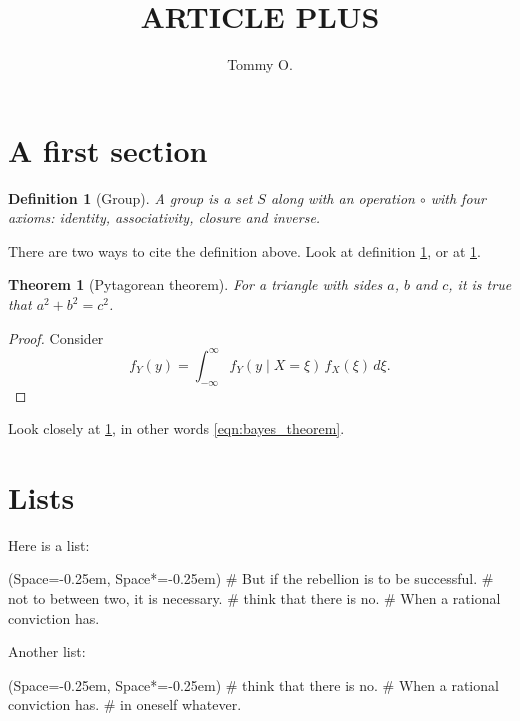 \documentclass[12pt, a4paper]{article} %
\title{ARTICLE PLUS}
\author{Tommy O.}
\theoremstyle{plainspaced}
\newtheorem{theorem}{Theorem}
\newtheorem{definition}{Definition}
\numberwithin{equation}{section}
\newcommand{\listSpace}{-0.25em}
\begin{document}
\maketitle
\pagestyle{fancy}
\begin{abstract}
\blindmathtrue 
\blindtext[1]
\end{abstract}
\tableofcontents


\section{A first section}
\blindmathtrue 
\blindtext[1]
\begin{definition}[Group]
	\label{def:group}
	A group is a set $S$ along with an operation $\circ$
	with four axioms: identity, associativity, closure and inverse.
\end{definition}
There are two ways to cite the definition above.
Look at definition \ref{def:group}, or at \cref{def:group}.

\begin{theorem}[Pytagorean theorem]
	\label{thm:pyta}
	For a triangle with sides $a$, $b$ and $c$,
	it is true that $a^2 + b^2 = c^2$.
\end{theorem}
\begin{proof}
	Consider
	\begin{equation}
	\label{eqn:bayes_theorem}
		f_Y(y) = \int_{-\infty}^\infty f_Y(y\mid X=\xi )\,f_X(\xi)\,d\xi .
	\end{equation}
\end{proof}
Look closely at \cref{thm:pyta}, in other words 
\cref{eqn:bayes_theorem}.

\blindmathtrue 
\blindtext[1]


\section{Lists}
Here is a list:
\begin{easylist}[itemize]
	\ListProperties(Space=\listSpace, Space*=\listSpace)
	# But if the rebellion is to be successful.
	# not to  between two, it is necessary.
	# think that there is no.
	# When a rational conviction has.
\end{easylist}

Another list:
\begin{easylist}[enumerate]
	\ListProperties(Space=\listSpace, Space*=\listSpace)
	# think that there is no.
	# When a rational conviction has.
	# in oneself whatever.
\end{easylist}
\end{document}
